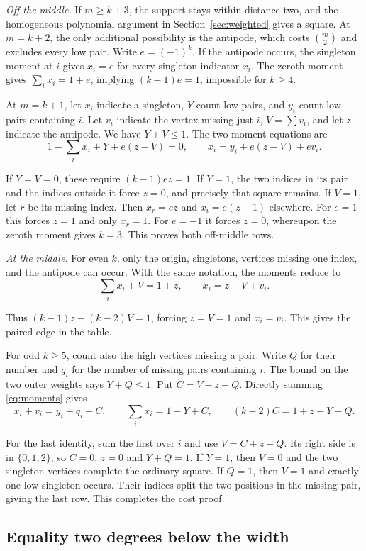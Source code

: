 \documentclass[11pt,letterpaper]{article}
\numberwithin{equation}{section}
\begin{document}
\emph{Off the middle.} If $m\ge k+3$, the support stays within distance two, and the homogeneous polynomial argument in Section~\ref{sec:weighted} gives a square. At $m=k+2$, the only additional possibility is the antipode, which costs $\binom m2$ and excludes every low pair. Write $e=(-1)^k$. If the antipode occurs, the singleton moment at $i$ gives $x_i=e$ for every singleton indicator $x_i$. The zeroth moment gives $\sum_i x_i=1+e$, implying $(k-1)e=1$, impossible for $k\ge4$.

At $m=k+1$, let $x_i$ indicate a singleton, $Y$ count low pairs, and $y_i$ count low pairs
containing $i$. Let $v_i$ indicate the vertex missing just $i$, $V=\sum v_i$, and let $z$
indicate the antipode. We have $Y+V\le1$. The two moment equations are
\[
1-\sum_i x_i+Y+e(z-V)=0,\qquad
x_i=y_i+e(z-V)+e v_i.
\]

If $Y=V=0$, these require $(k-1)ez=1$. If $Y=1$, the two indices in its pair and the indices
outside it force $z=0$, and precisely that square remains. If $V=1$, let $r$ be its missing
index. Then $x_r=ez$ and $x_i=e(z-1)$ elsewhere. For $e=1$ this forces $z=1$ and only $x_r=1$.
For $e=-1$ it forces $z=0$, whereupon the zeroth moment gives $k=3$. This proves both
off-middle rows.

\emph{At the middle.} For even $k$, only the origin, singletons, vertices missing one index, and the antipode can occur. With the same notation, the moments reduce to
\[
\sum_i x_i+V=1+z,\qquad x_i=z-V+v_i .
\]

Thus $(k-1)z-(k-2)V=1$, forcing $z=V=1$ and $x_i=v_i$. This gives the paired edge in the table.

For odd $k\ge5$, count also the high vertices missing a pair. Write $Q$ for their number and
$q_i$ for the number of missing pairs containing $i$. The bound on the two outer weights says
$Y+Q\le1$. Put $C=V-z-Q$. Directly summing \eqref{eq:moments} gives
\[
x_i+v_i=y_i+q_i+C,\qquad
\sum_i x_i=1+Y+C,\qquad (k-2)C=1+z-Y-Q .
\]

For the last identity, sum the first over $i$ and use $V=C+z+Q$. Its right side is in
$\{0,1,2\}$, so $C=0$, $z=0$ and $Y+Q=1$. If $Y=1$, then $V=0$ and the two singleton vertices
complete the ordinary square. If $Q=1$, then $V=1$ and exactly one low singleton occurs. Their
indices split the two positions in the missing pair, giving the last row. This completes the
cost proof.

\subsection{Equality two degrees below the width}\label{sec:eqhigh}
\end{document}
